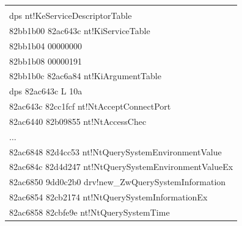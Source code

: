 \begin{table}[b]\small %


\vspace*{-6pt}


\begin{center}










\tabcolsep=9pt


\begin{tabular}{|l|}


\hline


\\[-9pt]


{\sf dps nt!KeServiceDescriptorTable}\\


{\sf 82bb1b00  82ac643c nt!KiServiceTable}\\


{\sf 82bb1b04  00000000}\\


{\sf 82bb1b08  00000191}\\


{\sf 82bb1b0c  82ac6a84 nt!KiArgumentTable}\\


{\sf dps 82ac643c L 10a}\\


{\sf 82ac643c  82cc1fcf nt!NtAcceptConnectPort}\\


{\sf 82ac6440  82b09855 nt!NtAccessChec}\\


$\ldots$\\


{\sf 82ac6848  82d4cc53 nt!NtQuerySystemEnvironmentValue}\\


{\sf 82ac684c  82d4d247 nt!NtQuerySystemEnvironmentValueEx}\\


{\sf 82ac6850  9dd0c2b0 drv!new\_ZwQuerySystemInformation}\\


{\sf 82ac6854  82cb2174 nt!NtQuerySystemInformationEx}\\


{\sf 82ac6858  82cbfe9e nt!NtQuerySystemTime}\\



\end{tabular}
\end{center}
\end{table}

